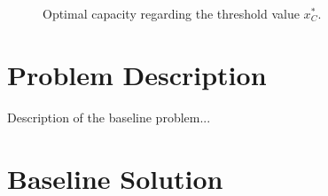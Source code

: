 \begin{figure}[!htb]
	\begin{subfigmatrix}{2}
	\end{subfigmatrix}
	\caption{Optimal capacity regarding the threshold value $x^*_C$.}
	\label{fig:2_k2}
\end{figure}























\pagebreak
\section{Problem Description}
\label{section:problem}

Description of the baseline problem...


\section{Baseline Solution}
\label{section:baseline}

